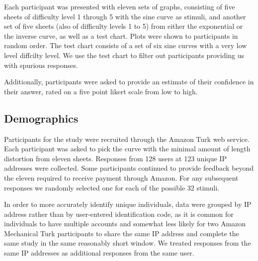 \documentclass[journal]{vgtc}\usepackage{graphicx, color}
\begin{document}
Each participant was presented with eleven sets of graphs, consisting of five sheets of difficulty level 1 through 5 with the sine curve as stimuli, and another set of five sheets (also of difficulty levels 1 to 5) from either the exponential or the inverse curve, as well as a test chart. Plots were shown to participants in random order.
The test chart consists of a set of six sine curves with a very low level diffcilty level. We use the test chart to filter out participants providing us with spurious responses.

Additionally, participants were  asked to provide an estimate of their confidence in their answer, rated on a five point likert scale from low to high. 




\subsection{Demographics}
Participants for the study were recruited through the Amazon Turk web service. 
Each participant was asked to pick the curve with the minimal amount of length distortion from eleven sheets. Responses from 128 users at 123 unique IP addresses were collected. 
Some participants continued to provide feedback beyond the eleven required to receive payment through Amazon. For any subsequent responses we randomly selected one for each of the possible 32 stimuli.

In order to more accurately identify unique individuals, data were grouped by IP address rather than by user-entered identification code, as it is common for individuals to have multiple accounts and somewhat less likely for two Amazon Mechanical Turk participants to share the same IP address and complete the same study in the same reasonably short window. We treated responses from the  same IP addresses as additional responses from the same user.
\end{document}
